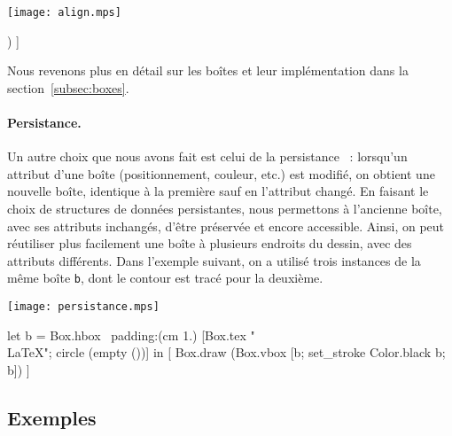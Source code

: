 \documentclass[twoside]{studia-Hermann}
\begin{document}
\medskip
\begin{minipage}{0.2\linewidth}
  \texttt{[image: align.mps]}
\end{minipage}
\begin{minipage}{0.8\linewidth}
\small\begin{ocaml}
[ Box.draw (Box.hbox ~padding:(cm 1.) 
              [Box.tex "\\LaTeX"; 
               circle (empty ())]) ]
\end{ocaml}
\end{minipage}

\medskip\noindent Nous revenons plus en détail sur les boîtes et leur
implémentation dans la section~\ref{subsec:boxes}.

\paragraph{Persistance.}
Un autre choix que nous avons fait est celui de la
persistance~\cite{persistance} : 
lorsqu'un attribut d'une boîte (positionnement, couleur, etc.) est
modifié, on obtient une nouvelle boîte, identique à la première sauf
en l'attribut changé. En faisant le choix de structures de données
persistantes, nous permettons à l'ancienne boîte, avec ses attributs
inchangés, d'être préservée et encore accessible. Ainsi, on peut
réutiliser plus facilement une boîte à plusieurs endroits
du dessin, avec des attributs différents. Dans l'exemple suivant, on a
utilisé trois instances de la même boîte \texttt{b}, dont le contour
est tracé pour la deuxième.

\medskip
\begin{minipage}{0.22\linewidth}
  \texttt{[image: persistance.mps]}
\end{minipage}
\begin{minipage}{0.78\linewidth}
\small\begin{ocaml}
let b = 
  Box.hbox ~padding:(cm 1.) 
    [Box.tex "\\LaTeX"; circle (empty ())] 
in
[ Box.draw (Box.vbox 
    [b; set_stroke Color.black b; b]) ]
\end{ocaml}
\end{minipage}


\subsection{Exemples}
\end{document}
